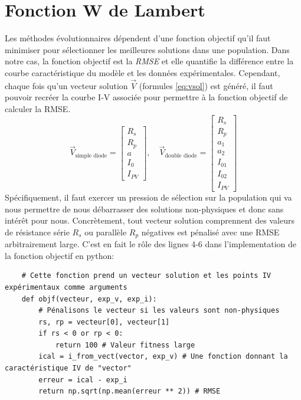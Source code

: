 \section{Fonction W de Lambert}
Les méthodes évolutionnaires dépendent d'une fonction objectif qu'il faut minimiser pour sélectionner les meilleures solutions dans une population. Dans notre cas, la fonction objectif est la \textit{RMSE}  et elle quantifie la différence entre la courbe caractéristique du modèle et les données expérimentales. Cependant, chaque fois qu'un vecteur solution $\vec{V}$ (formules \ref{eq:vsol}) est généré, il faut pouvoir recréer la courbe I-V associée pour permettre à la fonction objectif de calculer la RMSE.
\begin{equation}
  \label{eq:vsol}
  \vec{V}_{\text{simple diode}} = 
  \begin{bmatrix}
    R_s\\
    R_{p}\\
    a\\
    I_0\\
    I_{PV}
  \end{bmatrix},
  \quad
  \vec{V}_{\text{double diode}} = 
  \begin{bmatrix}
    R_s\\
    R_{p}\\
    a_1\\
    a_2\\
    I_{01}\\
    I_{02}\\
    I_{PV}
  \end{bmatrix}
\end{equation}
Spécifiquement, il faut exercer un pression de sélection sur la population qui va nous permettre de nous débarrasser des solutions non-physiques et donc sans intérêt pour nous. Concrètement, tout vecteur solution comprennent des valeurs de résistance série $R_s$ ou parallèle $R_p$ négatives est pénalisé avec une RMSE arbitrairement large. C'est en fait le rôle des lignes 4-6 dans l'implementation de la fonction objectif en python:\\

\noindent
\begin{minipage}{\linewidth}
\begin{verbatim}
    # Cette fonction prend un vecteur solution et les points IV expérimentaux comme arguments
    def objf(vecteur, exp_v, exp_i):
        # Pénalisons le vecteur si les valeurs sont non-physiques
        rs, rp = vecteur[0], vecteur[1]
        if rs < 0 or rp < 0:
            return 100 # Valeur fitness large
        ical = i_from_vect(vector, exp_v) # Une fonction donnant la caractéristique IV de "vector"
        erreur = ical - exp_i
        return np.sqrt(np.mean(erreur ** 2)) # RMSE         
\end{verbatim}
\end{minipage}
\vspace*{12pt}

